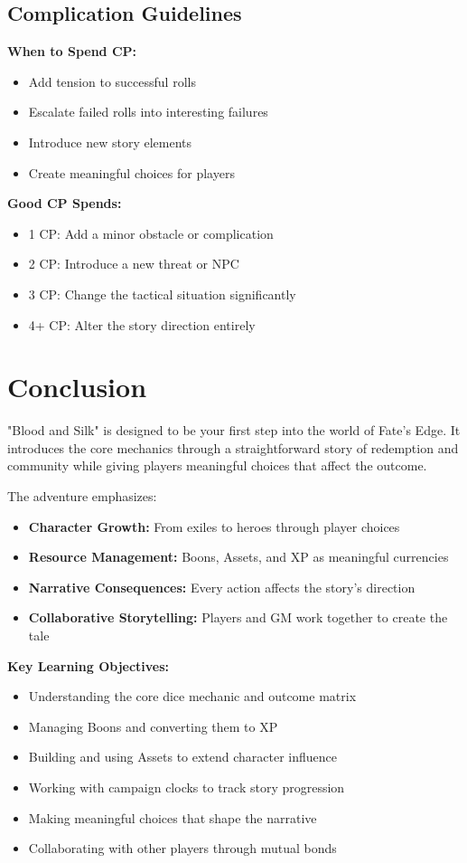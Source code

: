 \documentclass[11pt]{article}
\begin{document}
\subsection{Complication Guidelines}

\textbf{When to Spend CP:}
\begin{itemize}
\item Add tension to successful rolls
\item Escalate failed rolls into interesting failures
\item Introduce new story elements
\item Create meaningful choices for players
\end{itemize}

\textbf{Good CP Spends:}
\begin{itemize}
\item 1 CP: Add a minor obstacle or complication
\item 2 CP: Introduce a new threat or NPC
\item 3 CP: Change the tactical situation significantly
\item 4+ CP: Alter the story direction entirely
\end{itemize}

\section{Conclusion}

"Blood and Silk" is designed to be your first step into the world of Fate's Edge. It introduces the core mechanics through a straightforward story of redemption and community while giving players meaningful choices that affect the outcome.

The adventure emphasizes:
\begin{itemize}
\item \textbf{Character Growth:} From exiles to heroes through player choices
\item \textbf{Resource Management:} Boons, Assets, and XP as meaningful currencies
\item \textbf{Narrative Consequences:} Every action affects the story's direction
\item \textbf{Collaborative Storytelling:} Players and GM work together to create the tale
\end{itemize}

\textbf{Key Learning Objectives:}
\begin{itemize}
\item Understanding the core dice mechanic and outcome matrix
\item Managing Boons and converting them to XP
\item Building and using Assets to extend character influence
\item Working with campaign clocks to track story progression
\item Making meaningful choices that shape the narrative
\item Collaborating with other players through mutual bonds
\end{itemize}
\end{document}
